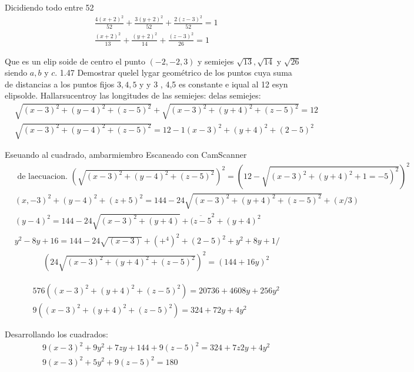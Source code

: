 Dicidiendo todo entre 52
$$
\begin{aligned}
	& \frac{4(x+2)^2}{52}+\frac{3(y+2)^2}{52}+\frac{2(z-3)^2}{52}=1 \\
	& \frac{(x+2)^2}{13}+\frac{(y+2)^2}{14}+\frac{(z-3)^2}{26}=1
\end{aligned}
$$

Que es un elip soide de centro el punto $(-2,-2,3)$ y semiejes $\sqrt{13}, \sqrt{14}$ y $\sqrt{26}$ siendo $a, b$ y $c$.
1.47 Demostrar quelel lygar geométrico de los puntos cuya suma de distancias a los puntos fijos $3,4,5$ y y 3 , 4,5 es constante e iqual al 12
esyn elipsolde. Hallarsucentroy las longitudes
de las semiejes: delas semiejes:
$$
\begin{aligned}
	& \sqrt{(x-3)^2+(y-4)^2+(z-5)^2}+\sqrt{(x-3)^2+(y+4)^2+(z-5)^2}=12 \\
	& \sqrt{(x-3)^2+(y-4)^2+(z-5)^2}=12-1(x-3)^2+(y+4)^2+(2-5)^2
\end{aligned}
$$

Eseuando al cuadrado, ambarmiembro
Escaneado con CamScanner
$$
\begin{aligned}
	& \text { de laecuacion. }\left(\sqrt{(x-3)^2+(y-4)^2+(z-5)^2}\right)^2=\left(12-\sqrt{\left.(x-3)^2+(y+4)^2+1=-5\right)^2}\right)^2 \\
	& (x,-3)^2+(y-4)^2+(z+5)^2=144-24 \sqrt{(x-3)^2+(y+4)^2+(z-5)^2}+(x / 3) \\
	& (y-4)^2=144-24 \sqrt{(x-3)^2+(y+4)}+\overline{(z-5}^2+(y+4)^2 \\
	& y^2-8 y+16=144-24 \sqrt{(x-3)}+\left(+^4\right)^2+(2-5)^2+y^2+8 y+1 /
\end{aligned}
$$
$$
\begin{aligned}
	& \left(24 \sqrt{(x-3)^2+(y+4)^2+(z-5)^2}\right)^2=(144+16 y)^2
\end{aligned}
$$




$$
\begin{aligned}
	& 576\left((x-3)^2+(y+4)^2+(z-5)^2\right)=20736+4608 y+256 y^2 \\
	& 9\left((x-3)^2+(y+4)^2+(z-5)^2\right)=324+72 y+4 y^2
\end{aligned}
$$

Desarrollando los cuadrados:
$$
\begin{aligned}
	& 9(x-3)^2+9 y^2+7 z y+144+9(z-5)^2=324+7 z 2 y+4 y^2 \\
	& 9(x-3)^2+5 y^2+9(z-5)^2=180
\end{aligned}
$$

